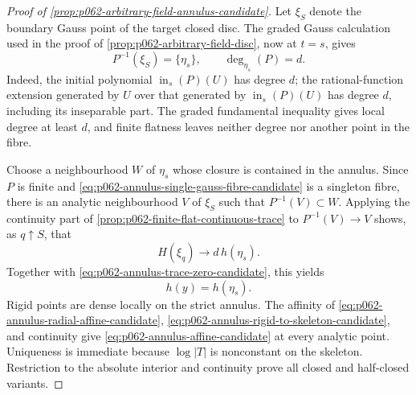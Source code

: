 \begin{proof}[Proof of \cref{prop:p062-arbitrary-field-annulus-candidate}]
Let \(\xi_S\) denote the boundary Gauss point of the target closed disc.
The graded Gauss calculation used in the proof of
\cref{prop:p062-arbitrary-field-disc}, now at \(t=s\), gives
\begin{equation}\label{eq:p062-annulus-single-gauss-fibre-candidate}
                      P^{-1}(\xi_S)=\{\eta_s\},
                      \qquad \deg_{\eta_s}(P)=d.
\end{equation}
Indeed, the initial polynomial
\(\operatorname{in}_s(P)(U)\) has degree \(d\); the rational-function
extension generated by \(U\) over that generated by
\(\operatorname{in}_s(P)(U)\) has degree \(d\), including its inseparable
part. The graded fundamental inequality gives local degree at least \(d\),
and finite flatness leaves neither degree nor another point in the fibre.

Choose a neighbourhood \(W\) of \(\eta_s\) whose closure is contained in
the annulus. Since \(P\) is finite and
\eqref{eq:p062-annulus-single-gauss-fibre-candidate} is a singleton fibre,
there is an analytic neighbourhood \(V\) of \(\xi_S\) such that
\(P^{-1}(V)\subset W\). Applying the continuity part of
\cref{prop:p062-finite-flat-continuous-trace} to
\(P^{-1}(V)\to V\) shows, as \(q\uparrow S\), that
\[
             H(\xi_q)\longrightarrow d\,h(\eta_s).
\]
Together with \eqref{eq:p062-annulus-trace-zero-candidate}, this yields
\begin{equation}\label{eq:p062-annulus-rigid-to-skeleton-candidate}
                              h(y)=h(\eta_s).
\end{equation}
Rigid points are dense locally on the strict annulus. The affinity of
\eqref{eq:p062-annulus-radial-affine-candidate},
\eqref{eq:p062-annulus-rigid-to-skeleton-candidate}, and continuity give
\eqref{eq:p062-annulus-affine-candidate} at every analytic point.
Uniqueness is immediate because \(\log|T|\) is nonconstant on the
skeleton. Restriction to the absolute interior and continuity prove all
closed and half-closed variants.
\end{proof}

